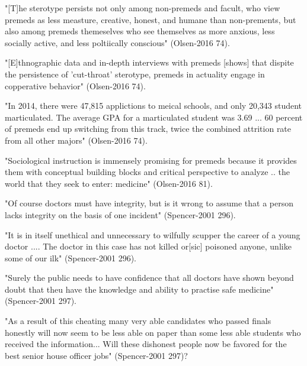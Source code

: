 "[T]he sterotype persists not only among non-premeds and facult, who view premeds as less measture, creative, honest, and humane than non-prements, but also among premeds themeselves who see themselves as more anxious, less socially active, and less poltiically conscious" (Olsen-2016 74).

"[E]thnographic data and in-depth interviews with premeds [shows] that dispite the persistence of 'cut-throat' sterotype, premeds in actuality engage in copperative behavior" (Olsen-2016 74).

"In 2014, there were 47,815 applictions to meical schools, and only 20,343 student marticulated. The average GPA for a marticulated student was 3.69 ... 60 percent of premeds end up switching from this track, twice the combined attrition rate from all other majors" (Olsen-2016 74).

"Sociological instruction is immensely promising for premeds because it provides them with conceptual building blocks and critical perspective to analyze .. the world that they seek to enter: medicine" (Olsen-2016 81).


"Of course doctors must have integrity, but is it wrong to assume that a person lacks integrity on the basis of one incident" (Spencer-2001 296).

"It is in itself unethical and unnecessary to wilfully scupper the career of a young doctor .... The doctor in this case has not killed or[sic] poisoned anyone, unlike some of our ilk" (Spencer-2001 296).

"Surely the public needs to have confidence that all doctors have shown beyond doubt that theu have the knowledge and ability to practise safe medicine" (Spencer-2001 297).

"As a result of this cheating many very able candidates who passed finals honestly will now seem to be less able on paper than some less able students who received the information... Will these dishonest people now be favored for the best senior house officer jobs" (Spencer-2001 297)?
